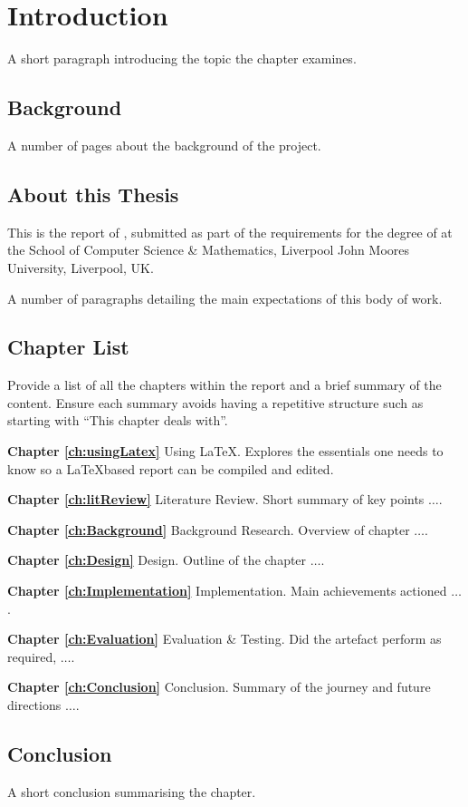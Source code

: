 \chapter{Introduction}
 \setcounter{page}{1}

A short paragraph introducing the topic the chapter examines.


\section{Background}

A number of pages about the background of the project.

\section{About this Thesis}
This is the report of \emph{\authorName}, submitted as part of the requirements for the degree of \degreeAward at the School of Computer Science \& Mathematics, Liverpool John Moores University, Liverpool, UK.

A number of paragraphs detailing the main expectations of this body of work.


\section{Chapter List}
Provide a list of all the chapters within the report and a brief summary of the content. Ensure each summary avoids having a repetitive structure such as starting with ``This chapter deals with''.

\textbf{Chapter \ref{ch:usingLatex}} Using \LaTeX. Explores the essentials one needs to know so a \LaTeX \space based report can be compiled and edited.

\textbf{Chapter \ref{ch:litReview}} Literature Review. Short summary of key points $\ldots$.

\textbf{Chapter \ref{ch:Background}} Background Research. Overview of chapter $\ldots$.

\textbf{Chapter \ref{ch:Design}} Design. Outline of the chapter $\ldots$.

\textbf{Chapter \ref{ch:Implementation}} Implementation. Main achievements actioned $\ldots$.

\textbf{Chapter \ref{ch:Evaluation}} Evaluation \& Testing. Did the artefact perform as required, $\ldots$.

\textbf{Chapter \ref{ch:Conclusion}} Conclusion. Summary of the journey and future directions $\ldots$.


\section{Conclusion}
A short conclusion summarising the chapter.
